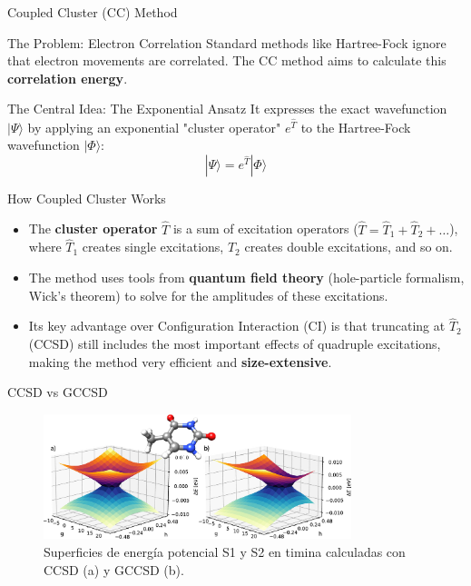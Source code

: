\begin{frame}{Coupled Cluster (CC) Method}
    \begin{block}{The Problem: Electron Correlation}
        Standard methods like Hartree-Fock ignore that electron movements are correlated. The CC method aims to calculate this \textbf{correlation energy}.
    \end{block}
    \pause

    \begin{alertblock}{The Central Idea: The Exponential Ansatz}
        It expresses the exact wavefunction $|\Psi\rangle$ by applying an exponential "cluster operator" $e^{\hat{T}}$ to the Hartree-Fock wavefunction $|\Phi\rangle$:
        \[
        |\Psi\rangle = e^{\hat{T}} |\Phi\rangle
        \]
    \end{alertblock}
\end{frame}


\begin{frame}{How Coupled Cluster Works}
    \begin{itemize}
        \item The \textbf{cluster operator} $\hat{T}$ is a sum of excitation operators ($\hat{T} = \hat{T}_1 + \hat{T}_2 + \dots$), where $\hat{T}_1$ creates single excitations, $\hat{T}_2$ creates double excitations, and so on.
        \pause
        \bigskip
        \item The method uses tools from \textbf{quantum field theory} (hole-particle formalism, Wick's theorem) to solve for the amplitudes of these excitations.
        \pause
        \bigskip
        \item Its key advantage over Configuration Interaction (CI) is that truncating at $\hat{T}_2$ (CCSD) still includes the most important effects of quadruple excitations, making the method very efficient and \textbf{size-extensive}.
    \end{itemize}
\end{frame}

\begin{frame}{CCSD vs GCCSD}
    \begin{figure}
        \includegraphics[width=0.8\textwidth]{images/CCSD.jpeg}
        \caption{Superficies de energía potencial S1 y S2 en timina calculadas con CCSD (a) y GCCSD (b).}
    \end{figure}
\end{frame}
